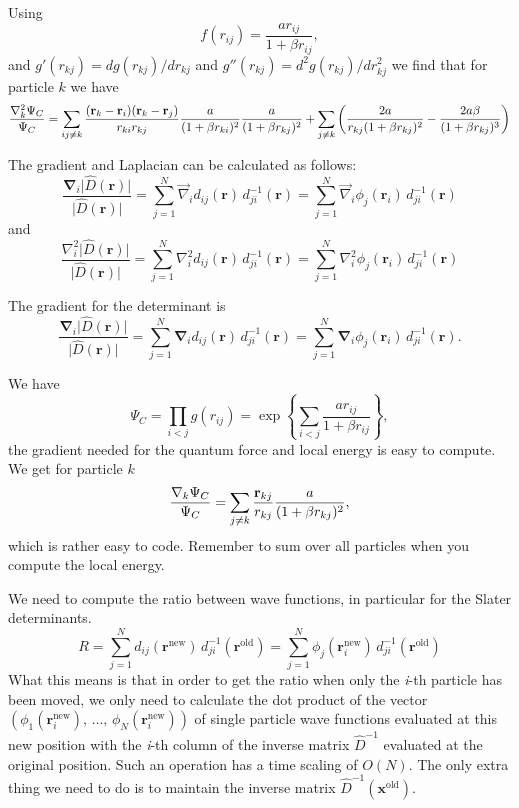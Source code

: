 \documentclass[graybox,sectrefs,envcountresetchap,open=right]{svmonodo}
\begin{document}
Using 
\[
f(r_{ij})= \frac{ar_{ij}}{1+\beta r_{ij}},
\]
and $g'(r_{kj})=dg(r_{kj})/dr_{kj}$ and 
$g''(r_{kj})=d^2g(r_{kj})/dr_{kj}^2$  we find that for particle  $k$
we have
\[
  \frac{\nabla^2_k \Psi_C}{\Psi_C }=
\sum_{ij\ne k}\frac{({\bf r}_k-{\bf r}_i)({\bf r}_k-{\bf r}_j)}{r_{ki}r_{kj}}\frac{a}{(1+\beta r_{ki})^2}
\frac{a}{(1+\beta r_{kj})^2}+
\sum_{j\ne k}\left(\frac{2a}{r_{kj}(1+\beta r_{kj})^2}-\frac{2a\beta}{(1+\beta r_{kj})^3}\right)
\]



The gradient and
Laplacian can be calculated as follows:
\[
\frac{\mathbf{\nabla}_i\vert\hat{D}(\mathbf{r})\vert}
{\vert\hat{D}(\mathbf{r})\vert} =
\sum_{j=1}^N \vec\nabla_i d_{ij}(\mathbf{r})\,
d_{ji}^{-1}(\mathbf{r}) =
\sum_{j=1}^N \vec\nabla_i \phi_j(\mathbf{r}_i)\,
d_{ji}^{-1}(\mathbf{r})
\]
and
\[
\frac{\nabla^2_i\vert\hat{D}(\mathbf{r})\vert}
{\vert\hat{D}(\mathbf{r})\vert} =
\sum_{j=1}^N \nabla^2_i d_{ij}(\mathbf{r})\,
d_{ji}^{-1}(\mathbf{r}) =
\sum_{j=1}^N \nabla^2_i \phi_j(\mathbf{r}_i)\,
d_{ji}^{-1}(\mathbf{r})
\]




The gradient for the determinant is 
\[
\frac{\mathbf{\nabla}_i\vert\hat{D}(\mathbf{r})\vert}
{\vert\hat{D}(\mathbf{r})\vert} =
\sum_{j=1}^N \mathbf{\nabla}_i d_{ij}(\mathbf{r})\,
d_{ji}^{-1}(\mathbf{r}) =
\sum_{j=1}^N \mathbf{\nabla}_i \phi_j(\mathbf{r}_i)\,
d_{ji}^{-1}(\mathbf{r}).
\]





We have
\[
\Psi_C=\prod_{i< j}g(r_{ij})= \exp{\left\{\sum_{i<j}\frac{ar_{ij}}{1+\beta r_{ij}}\right\}},
\]
the gradient needed for the quantum force and local energy is easy to compute.  
We get for particle  $k$
\[
\frac{ \nabla_k \Psi_C}{ \Psi_C }= \sum_{j\ne k}\frac{{\bf r}_{kj}}{r_{kj}}\frac{a}{(1+\beta r_{kj})^2},
\]
which is rather easy to code.  Remember to sum over all particles  when you compute the local energy.





We need to compute the ratio between wave functions, in particular  for the Slater determinants.
\[
R =\sum_{j=1}^N d_{ij}(\mathbf{r}^{\mathrm{new}})\,
d_{ji}^{-1}(\mathbf{r}^{\mathrm{old}}) = 
\sum_{j=1}^N \phi_j(\mathbf{r}_i^{\mathrm{new}})\,
d_{ji}^{-1}(\mathbf{r}^{\mathrm{old}})
\]
What this means is that in order to get the ratio when only the \emph{i}-th
particle  has been moved, we only need to calculate the dot
product of the vector $\left(\phi_1(\mathbf{r}_i^\mathrm{new}),\,\dots,\,
\phi_N(\mathbf{r}_i^\mathrm{new})\right)$ of single particle  wave functions
evaluated at this new position with the \emph{i}-th column of the inverse
matrix $\hat{D}^{-1}$ evaluated at the original position. Such
an operation has a time scaling of $O(N)$. The only extra thing we
need to do is to maintain the inverse matrix 
$\hat{D}^{-1}(\mathbf{x}^{\mathrm{old}})$.
\end{document}
